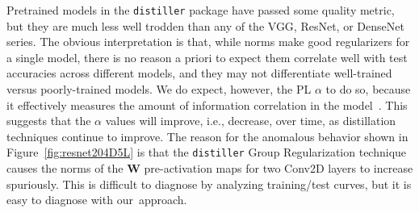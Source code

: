 Pretrained models in the \texttt{distiller} package have passed some quality metric, but they are much less well trodden than any of the VGG, ResNet, or DenseNet series.  
The obvious interpretation is that, while norms make good regularizers for a single model, there is no reason a priori to expect them correlate well with test accuracies across different models, and they may not differentiate well-trained versus poorly-trained models.
We do expect, however, the PL $\alpha$ to do so, because it effectively measures the amount of information correlation in the model~\cite{MM18_TR, MM19_HTSR_ICML, MM20_SDM}.
This suggests that the $\alpha$ values will improve, i.e., decrease, over time, as distillation techniques continue to improve.
The reason for the anomalous behavior shown in 
Figure~\ref{fig:resnet204D5L}
is that the \texttt{distiller} Group Regularization technique 
causes the norms of the $\mathbf{W}$ pre-activation maps for two Conv2D layers to increase spuriously.
This is difficult to diagnose by analyzing training/test curves, but it is easy to diagnose with our~approach.



